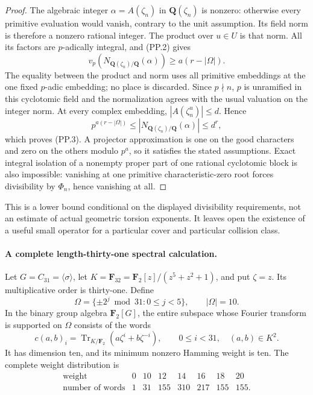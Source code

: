 \begin{proof}
The algebraic integer $\alpha=A(\zeta_n)$ in
$\mathbf Q(\zeta_n)$ is nonzero: otherwise every primitive
evaluation would vanish, contrary to the unit assumption.
Its field norm is therefore a nonzero rational integer.
The product over $u\in U$ is that norm. All its factors are
$p$-adically integral, and (PP.2) gives
\[
 v_p\!\left(N_{\mathbf Q(\zeta_n)/\mathbf Q}(\alpha)\right)
                         \ge a(r-|\Omega|).
 \tag{PP.4}
\]
The equality between the product and norm uses all primitive
embeddings at the one fixed $p$-adic embedding; no place is
discarded. Since $p\nmid n$, $p$ is unramified in this cyclotomic
field and the normalization agrees with the usual valuation on
the integer norm. At every complex embedding,
$|A(\zeta_n^u)|\le d$. Hence
\[
 p^{a(r-|\Omega|)}
       \le\left|N_{\mathbf Q(\zeta_n)/\mathbf Q}(\alpha)\right|
       \le d^r,
\]
which proves (PP.3). A projector approximation is one on the
good characters and zero on the others modulo $p^a$, so it
satisfies the stated assumptions. Exact integral isolation of
a nonempty proper part of one rational cyclotomic block is
also impossible: vanishing at one primitive characteristic-zero
root forces divisibility by $\Phi_n$, hence vanishing at all.
\end{proof}

This is a lower bound conditional on the displayed divisibility
requirements, not an estimate of actual geometric torsion
exponents. It leaves open the existence of a useful small
operator for a particular cover and particular collision class.

\paragraph{A complete length-thirty-one spectral calculation.}
Let $G=C_{31}=\langle\sigma\rangle$, let
$K=\mathbf F_{32}=\mathbf F_2[z]/(z^5+z^2+1)$, and put
$\zeta=z$. Its multiplicative order is thirty-one. Define
\[
 \Omega=\{\pm2^j\bmod31:0\le j<5\},\qquad |\Omega|=10.
 \tag{PP.5}
\]
In the binary group algebra $\mathbf F_2[G]$, the entire
subspace whose Fourier transform is supported on $\Omega$
consists of the words
\[
 c(a,b)_i=\operatorname{Tr}_{K/\mathbf F_2}
             (a\zeta^i+b\zeta^{-i}),
       \qquad 0\le i<31,\quad (a,b)\in K^2.
 \tag{PP.6}
\]
It has dimension ten, and its minimum nonzero Hamming weight
is ten. The complete weight distribution is
\[
\begin{array}{c|rrrrrrr}
\text{weight}&0&10&12&14&16&18&20\\
\hline
\text{number of words}&1&31&155&310&217&155&155.
\end{array}
 \tag{PP.7}
\]

